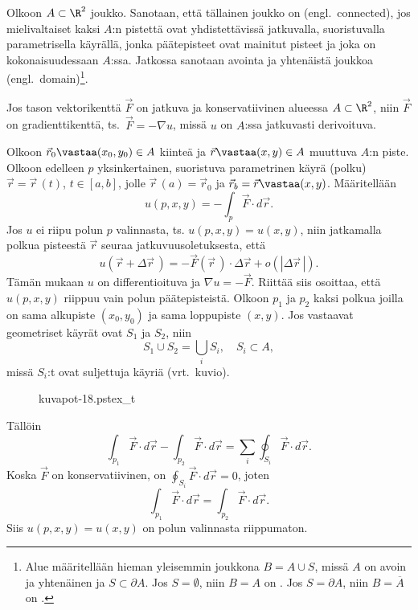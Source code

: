 %
Olkoon $A\subset\R^2$  joukko. Sanotaan, että tällainen joukko on 
(engl.\ connected), jos mielivaltaiset kaksi $A$:n pistettä ovat yhdistettävissä jatkuvalla, 
suoristuvalla parametrisella käyrällä, jonka päätepisteet ovat mainitut pisteet ja joka on 
kokonaisuudessaan $A$:ssa. Jatkossa sanotaan avointa ja yhtenäistä joukkoa
%
 (engl.\ domain)\footnote[2]{Alue määritellään hieman yleisemmin joukkona
$B = A \cup S$, missä $A$ on avoin ja yhtenäinen ja $S \subset \partial A$. Jos
$S = \emptyset$, niin $B=A$ on . Jos $S=\partial A$, niin $B=\overline{A}$ on
.  }. 
\begin{Lause} \label{Lpot-1} 
Jos tason vektorikenttä $\vec F$ on jatkuva ja konservatiivinen alueessa $A \subset \R^2$, niin
$\vec F$ on gradienttikenttä, ts.\ $\vec F=-\nabla u$, missä $u$ on $A$:ssa jatkuvasti
derivoituva.
\end{Lause}
\tod Olkoon $\vec r_0\vastaa (x_0,y_0)\in A$ kiinteä ja $\vec r\vastaa (x,y)\in A$ muuttuva 
$A$:n piste. Olkoon edelleen $p$ yksinkertainen, suoristuva parametrinen käyrä (polku) 
$\vec r=\vec r\,(t)$, $t\in [a,b]$, jolle $\vec r\,(a)=\vec r_0$ ja
$\vec r_b=\vec r\vastaa (x,y)$. Määritellään
\[
u(p,x,y)=-\int_p \vec F\cdot d\vec r.
\]
Jos $u$ ei riipu polun $p$ valinnasta, ts. $u(p,x,y)=u(x,y)$, niin jatkamalla polkua pisteestä
$\vec r$ seuraa jatkuvuusoletuksesta, että
\[
u(\vec r+\Delta\vec r\,)=-\vec F(\vec r\,)\cdot\Delta\vec r+o(|\Delta\vec r\,|).
\]
Tämän mukaan $u$ on differentioituva ja $\nabla u=-\vec F$. Riittää siis osoittaa, että
$u(p,x,y)$ riippuu vain polun päätepisteistä. Olkoon $p_1$ ja $p_2$ kaksi polkua joilla on sama
alkupiste $(x_0,y_0)$ ja sama loppupiste $(x,y)$. Jos vastaavat geometriset käyrät ovat $S_1$
ja $S_2$, niin
\[
S_1\cup S_2=\bigcup_i S_i,\quad S_i\subset A,
\]
missä $S_i$:t ovat suljettuja käyriä (vrt.\ kuvio).
\vspace{3mm}
\begin{figure}[H]
\begin{center}
{kuvapot-18.pstex_t}
\end{center}
\end{figure}
Tällöin 
\[
\int_{p_1} \vec F\cdot d\vec r-\int_{p_2} \vec F\cdot d\vec r
                         = \sum_i \oint_{S_i} \vec F\cdot d\vec r.
\]
Koska $\vec F$ on konservatiivinen, on $\oint_{S_i} \vec F\cdot d\vec r=0$, joten
\[
\int_{p_1} \vec F\cdot d\vec r=\int_{p_2} \vec F\cdot d\vec r.
\]
Siis $u(p,x,y)=u(x,y)$ on polun valinnasta riippumaton. \loppu

